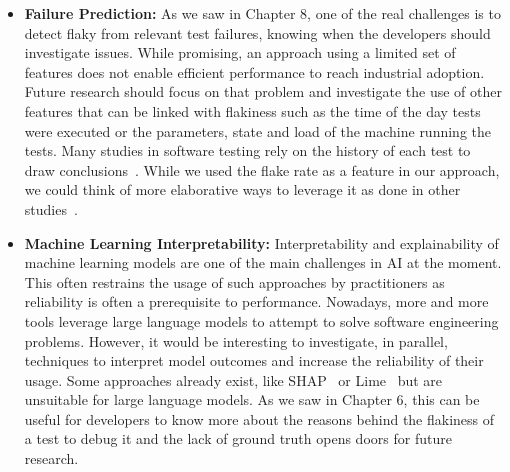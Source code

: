 \begin{itemize}
    \item \textbf{Failure Prediction:} As we saw in Chapter 8, one of the real challenges is to detect flaky from relevant test failures, \ie knowing when the developers should investigate issues. While promising, an approach using a limited set of features does not enable efficient performance to reach industrial adoption. Future research should focus on that problem and investigate the use of other features that can be linked with flakiness such as the time of the day tests were executed or the parameters, state and load of the machine running the tests. Many studies in software testing rely on the history of each test to draw conclusions~\cite{Wen:2019:tse,Azizi2018}. While we used the flake rate as a feature in our approach, we could think of more elaborative ways to leverage it as done in other studies~\cite{gruber2023practical,Kowalczyk2020}.
    
    \item \textbf{Machine Learning Interpretability:} Interpretability and explainability of machine learning models are one of the main challenges in AI at the moment. This often restrains the usage of such approaches by practitioners as reliability is often a prerequisite to performance. Nowadays, more and more tools leverage large language models to attempt to solve software engineering problems. However, it would be interesting to investigate, in parallel, techniques to interpret model outcomes and increase the reliability of their usage. Some approaches already exist, like SHAP~\cite{shaponline} or Lime~\cite{ribeiro2016should} but are unsuitable for large language models. As we saw in Chapter 6, this can be useful for developers to know more about the reasons behind the flakiness of a test to debug it and the lack of ground truth opens doors for future research. 
\end{itemize}

